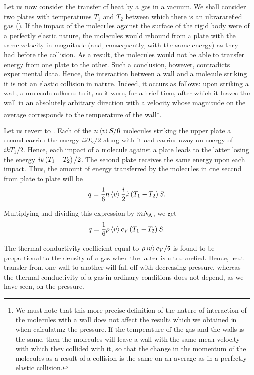 Let us now consider the transfer of heat by a gas in a vacuum. We shall consider two plates with temperatures $T_1$ and $T_2$ between which there is an ultrararefied gas (). If the impact of the molecules against the surface of the rigid body were of a perfectly elastic nature, the molecules would rebound from a plate with the same velocity in magnitude (and, consequently, with the same energy) as they had before the collision. As a result, the molecules would not be able to transfer energy from one plate to the other. Such a conclusion, however, contradicts experimental data. Hence, the interaction between a wall and a molecule striking it is not an elastic collision in nature. Indeed, it occurs as follows: upon striking a wall, a molecule adheres to it, as it were, for a brief time, after which it leaves the wall in an absolutely arbitrary direction with a velocity whose magnitude on the average corresponds to the temperature of the wall\footnote{We must note that this more precise definition of the nature of interaction of the molecules with a wall does not affect the results which we obtained in  when calculating the pressure. If the temperature of the gas and the walls is the same, then the molecules will leave a wall with the same mean velocity with which they collided with it, so that the change in the momentum of the molecules as a result of a collision is the same on an average as in a perfectly elastic collision.}.

Let us revert to . Each of the $n\left\langle v \right\rangle S/6$ molecules striking the upper plate a second carries the energy $ikT_2/2$ along with
it and carries away an energy of $ikT_1/2$. Hence, each impact of a molecule against a plate leads to the latter losing the energy $ik\left(T_1-T_2\right)/2$. The second plate receives the same energy upon each impact. Thus, the amount of energy transferred by the molecules in one second from plate to plate will be
\begin{equation*}
    q = \frac{1}{6} n \left\langle v \right\rangle \frac{i}{2} k \left(T_1-T_2\right) S.
\end{equation*}

\noindent
Multiplying and dividing this expression by $mN_{\text{A}}$, we get
\begin{equation}\label{eq:16_32}
    q = \frac{1}{6} \rho \left\langle v \right\rangle c_V \left(T_1-T_2\right) S.
\end{equation}

The thermal conductivity coefficient equal to $\rho\left\langle v \right\rangle c_V/6$ is found to be proportional to the density of a gas when the latter is ultrararefied. Hence, heat transfer from one wall to another will fall off with decreasing pressure, whereas the thermal conductivity of a gas in ordinary conditions does not depend, as we have seen, on the pressure.
